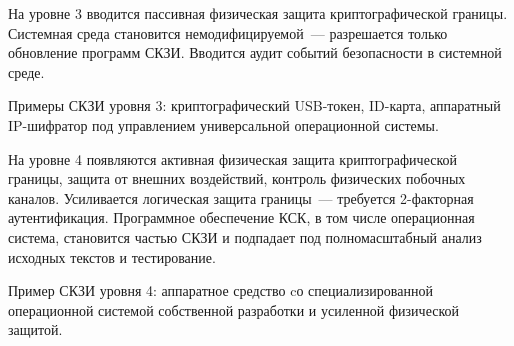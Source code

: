 На уровне 3 вводится пассивная физическая защита криптографической 
границы. Системная среда становится немодифицируемой~--- разрешается 
только обновление программ СКЗИ. Вводится аудит событий безопасности в 
системной среде.

Примеры СКЗИ уровня 3: криптографический USB-токен, ID-карта, 
аппаратный IP-шифратор под управлением универсальной операционной 
системы.

На уровне 4 появляются\addendum{:} активная физическая защита криптографической 
границы, защита от внешних воздействий, контроль физических побочных каналов.
%
Усиливается логическая защита границы~--- требуется 2-факторная 
аутентификация.
%
Программное обеспечение КСК, в том числе операционная система, становится 
частью СКЗИ и подпадает под полномасштабный анализ исходных текстов и 
тестирование. 

Пример СКЗИ уровня 4: аппаратное средство 
cо специализированной операционной системой собственной разработки
и усиленной физической защитой. 

